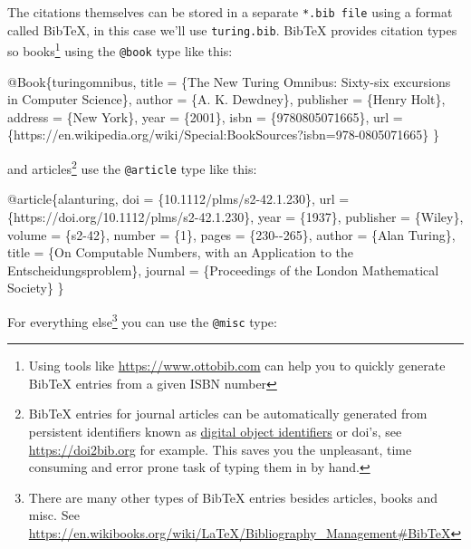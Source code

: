 \documentclass[
]{book}
\newenvironment{Shaded}{\begin{snugshade}}{\end{snugshade}}
\newcommand{\NormalTok}[1]{#1}
\begin{document}
The citations themselves can be stored in a separate \texttt{*.bib\ file} using a format called BibTeX, in this case we'll use \texttt{turing.bib}. BibTeX provides citation types so books\footnote{Using tools like \url{https://www.ottobib.com} can help you to quickly generate BibTeX entries from a given ISBN number} using the \texttt{@book} type like this:

\begin{Shaded}
\begin{Highlighting}[]
\NormalTok{@Book\{turingomnibus,}
\NormalTok{  title = \{The New Turing Omnibus: Sixty{-}six excursions in Computer Science\},}
\NormalTok{  author = \{A. K. Dewdney\},}
\NormalTok{  publisher = \{Henry Holt\},}
\NormalTok{  address = \{New York\},}
\NormalTok{  year = \{2001\},}
\NormalTok{  isbn = \{9780805071665\},}
\NormalTok{  url = \{https://en.wikipedia.org/wiki/Special:BookSources?isbn=978{-}0805071665\}}
\NormalTok{\}}
\end{Highlighting}
\end{Shaded}

and articles\footnote{BibTeX entries for journal articles can be automatically generated from persistent identifiers known as \href{https://en.wikipedia.org/wiki/Digital_object_identifier}{digital object identifiers} or doi's, see \url{https://doi2bib.org} for example. This saves you the unpleasant, time consuming and error prone task of typing them in by hand.} use the \texttt{@article} type like this:

\begin{Shaded}
\begin{Highlighting}[]
\NormalTok{@article\{alanturing,}
\NormalTok{  doi = \{10.1112/plms/s2{-}42.1.230\},}
\NormalTok{  url = \{https://doi.org/10.1112/plms/s2{-}42.1.230\},}
\NormalTok{  year = \{1937\},}
\NormalTok{  publisher = \{Wiley\},}
\NormalTok{  volume = \{s2{-}42\},}
\NormalTok{  number = \{1\},}
\NormalTok{  pages = \{230{-}{-}265\},}
\NormalTok{  author = \{Alan Turing\},}
\NormalTok{  title = \{On Computable Numbers, with an Application to the Entscheidungsproblem\},}
\NormalTok{  journal = \{Proceedings of the London Mathematical Society\}}
\NormalTok{\}}
\end{Highlighting}
\end{Shaded}

For everything else\footnote{There are many other types of BibTeX entries besides articles, books and misc. See \url{https://en.wikibooks.org/wiki/LaTeX/Bibliography_Management\#BibTeX}} you can use the \texttt{@misc} type:
\end{document}
